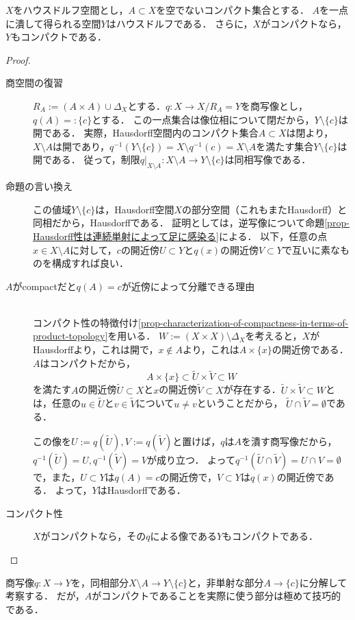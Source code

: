\documentclass[uplatex,dvipdfmx]{jsreport}
\begin{document}
\begin{proposition}[ハウスドルフはコンパクト集合を一点に潰してもハウスドルフである]\label{prop-compact-Hausdorff-after-one-point-quotient-map}
    $X$をハウスドルフ空間とし，$A\subset X$を空でないコンパクト集合とする．
    $A$を一点に潰して得られる空間$Y$はハウスドルフである．
    さらに，$X$がコンパクトなら，$Y$もコンパクトである．
\end{proposition}
\begin{proof}\mbox{}
    \begin{description}
        \item[商空間の復習] 
        $R_A:=(A\times A)\cup\Delta_X$とする．$q:X\to X/R_A=Y$を商写像とし，$q(A)=:\{c\}$とする．
        この一点集合は像位相について閉だから，$Y\setminus\{c\}$は開である．
        実際，Hausdorff空間内のコンパクト集合$A\subset X$は閉より，$X\setminus A$は開であり，$q^{-1}(Y\setminus\{c\})=X\setminus q^{-1}(c)=X\setminus A$を満たす集合$Y\setminus\{c\}$は開である．
        従って，制限$q|_{X\setminus A}:X\setminus A\to Y\setminus\{c\}$は同相写像である．
        \item[命題の言い換え]
        この値域$Y\setminus\{c\}$は，Hausdorff空間$X$の部分空間（これもまたHausdorff）と同相だから，Hausdorffである．
        証明としては，逆写像について命題\ref{prop-Hausdorff性は連続単射によって足に感染る}による．
        以下，任意の点$x\in X\setminus A$に対して，$c$の開近傍$U\subset Y$と$q(x)$の開近傍$V\subset Y$で互いに素なものを構成すれば良い．
        \item[$A$がcompactだと$q(A)=c$が近傍によって分離できる理由] \mbox{}\\
        コンパクト性の特徴付け\ref{prop-characterization-of-compactness-in-terms-of-product-topology}を用いる．
        $W:=(X\times X)\setminus\Delta_X$を考えると，$X$がHausdorffより，これは開で，$x\notin A$より，これは$A\times\{x\}$の開近傍である．
        $A$はコンパクトだから，
        \[A\times\{x\}\subset\tilde{U}\times\tilde{V}\subset W\]
        を満たす$A$の開近傍$\tilde{U}\subset X$と$x$の開近傍$\tilde{V}\subset X$が存在する．$\tilde{U}\times\tilde{V}\subset W$とは，任意の$u\in\tilde{U}$と$v\in\tilde{V}$について$u\ne v$ということだから，
        $\tilde{U}\cap\tilde{V}=\emptyset$である．

        この像を$U:=q(\tilde{U}),V:=q(\tilde{V})$と置けば，$q$は$A$を潰す商写像だから，$q^{-1}(\tilde{U})=U,q^{-1}(\tilde{V})=V$が成り立つ．
        よって$q^{-1}(\tilde{U}\cap\tilde{V})=U\cap V=\emptyset$で，また，$U\subset Y$は$q(A)=c$の開近傍で，$V\subset Y$は$q(x)$の開近傍である．
        よって，$Y$はHausdorffである．
        \item[コンパクト性] $X$がコンパクトなら，その$q$による像である$Y$もコンパクトである．
    \end{description}
\end{proof}
\begin{remarks}
    商写像$q:X\to Y$を，同相部分$X\setminus A\to Y\setminus\{c\}$と，非単射な部分$A\to\{c\}$に分解して考察する．
    だが，$A$がコンパクトであることを実際に使う部分は極めて技巧的である．
\end{remarks}
\end{document}
